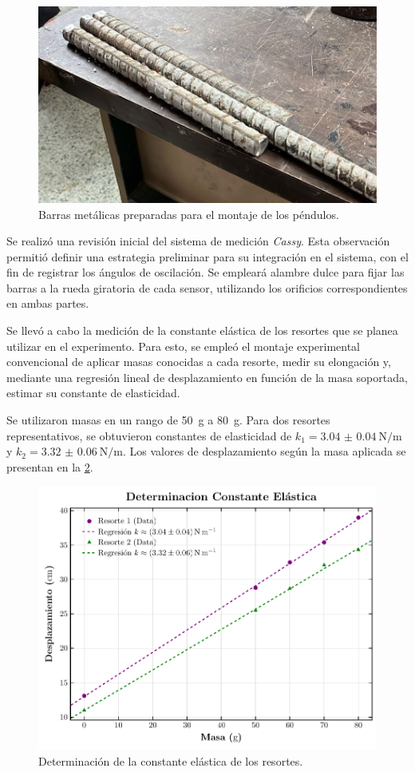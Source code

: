 \begin{figure}[htbp!]
	\centering
	\includegraphics[width=0.7\linewidth]{./Figures/metal-bars.jpeg}
	\caption{Barras metálicas preparadas para el montaje de los péndulos.}
	\label{fig:metal-bars}
\end{figure}

Se realizó una revisión inicial del sistema de medición \emph{Cassy}.
Esta observación permitió definir una estrategia preliminar para
su integración en el sistema, con el fin de registrar los
ángulos de oscilación. Se empleará alambre dulce para fijar las
barras a la rueda giratoria de cada sensor, utilizando los
orificios correspondientes en ambas partes.

Se llevó a cabo la medición de la constante elástica de los
resortes que se planea utilizar en el experimento. Para esto,
se empleó el montaje experimental convencional de aplicar masas
conocidas a cada resorte, medir su elongación y, mediante una
regresión lineal de desplazamiento en función de la masa soportada,
estimar su constante de elasticidad.

Se utilizaron masas en un rango de \qty{50}{\gram} a \qty{80}{\gram}.
Para dos resortes representativos, se obtuvieron constantes de
elasticidad de \(k_1 = \qty{3.04(4)}{\N\per\m}\) y
\(k_2 = \qty{3.32(6)}{\N\per\m}\). Los valores de desplazamiento
según la masa aplicada se presentan en la \cref{fig:springs-plot}.

\begin{figure}[htbp!]
	\centering
	\includegraphics[width=0.6\linewidth]{./Figures/springs-plot.pdf}
	\caption{Determinación de la constante elástica de los resortes.}
	\label{fig:springs-plot}
\end{figure}
